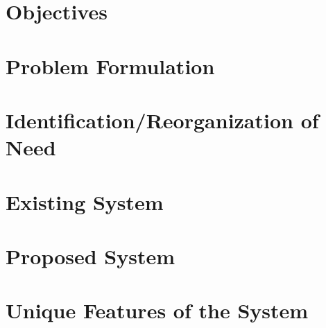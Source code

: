 \section{Objectives}

 

\section{Problem Formulation}


\section{Identification/Reorganization of Need}

\section{Existing System}

\section{Proposed System}

\section{Unique Features of the System}



